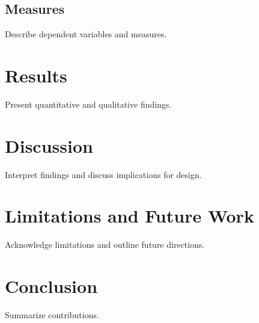 \documentclass[sigchi,review]{acmart}
\begin{document}
\subsection{Measures}
Describe dependent variables and measures.

\section{Results}
Present quantitative and qualitative findings.

\section{Discussion}
Interpret findings and discuss implications for design.

\section{Limitations and Future Work}
Acknowledge limitations and outline future directions.

\section{Conclusion}
Summarize contributions.



\end{document}
